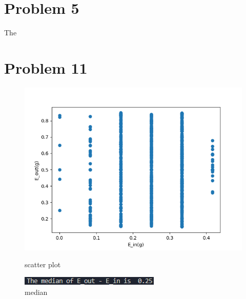 \documentclass[12pt,a4paper]{article}
\begin{document}
\section*{Problem 5}
The 

\newpage
\section*{Problem 11}    

\begin{figure}[hbp]
    \centering
    \begin{minipage}{0.48\linewidth}
        \centering
        \includegraphics[width = \linewidth]{Hw2P11.png}
        \caption{scatter plot}
    \end{minipage}\hfil
    \begin{minipage}{0.48\linewidth}
        \centering
        \includegraphics[width = \linewidth]{Hw2P11 median.png}
        \caption{median}
    \end{minipage}\hfil
    \centering

\end{figure}
\end{document}
